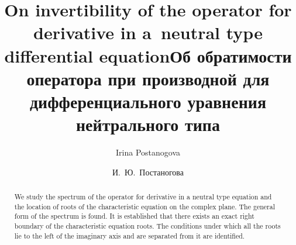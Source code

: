 \begin{englishtitle}
\title{On invertibility of the operator for derivative in a~neutral type differential equation}
\author{Irina Postanogova}

\maketitle

\begin{abstract}
We study the spectrum of the operator for derivative in a neutral type equation and the location of roots of the characteristic equation on the complex plane. The general form of the spectrum is found.
It is established that there exists an exact right boundary of the characteristic equation roots.
 The conditions under which all the roots lie to the left of the imaginary axis and are separated from it are identified.

\end{abstract}
\end{englishtitle}

\iffalse
\documentclass[12pt]{llncs}
\usepackage[T2A]{fontenc}
\usepackage[utf8]{inputenc}
\usepackage[english,russian]{babel}
\usepackage[russian]{nla}




\fi

\title{Об обратимости оператора при производной для дифференциального уравнения нейтрального типа}
\author{И.~Ю.~Постаногова
 } %


\maketitle


